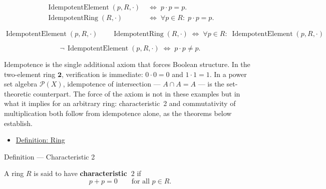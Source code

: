 \begin{remark*}
\[
\begin{aligned}
\operatorname{IdempotentElement}(p, R, \cdot)
&\;\Longleftrightarrow\; p \cdot p = p. \\[4pt]
\operatorname{IdempotentRing}(R, \cdot)
&\;\Longleftrightarrow\; \forall p \in R{:}\; p \cdot p = p.
\end{aligned}
\]
\end{remark*}

\begin{remark*}
\[
\operatorname{IdempotentElement}(p,R,\cdot)
\qquad
\operatorname{IdempotentRing}(R,\cdot)
\;\Longleftrightarrow\;
\forall p \in R{:}\;
\operatorname{IdempotentElement}(p,R,\cdot)
\]
\end{remark*}

\begin{remark*}
\[
\neg\,\operatorname{IdempotentElement}(p,R,\cdot)
\;\Longleftrightarrow\;
p \cdot p \neq p.
\]
\end{remark*}

\begin{remark*}[Interpretation]
Idempotence is the single additional axiom that forces Boolean
structure.  In the two-element ring $\mathbf{2}$, verification is
immediate: $0 \cdot 0 = 0$ and $1 \cdot 1 = 1$.  In a power set
algebra $\mathcal{P}(X)$, idempotence of intersection --- $A \cap A
= A$ --- is the set-theoretic counterpart.  The force of the axiom
is not in these examples but in what it implies for an arbitrary
ring: characteristic~2 and commutativity of multiplication both
follow from idempotence alone, as the theorems below establish.
\end{remark*}

\begin{remark*}[Dependencies]
\begin{itemize}
  \item \hyperref[def:ring]{Definition: Ring}
\end{itemize}
\end{remark*}


\begin{definitionbox}{Definition --- Characteristic 2}
\begin{definition}[Characteristic 2]
\label{def:characteristic-2}
A ring $R$ is said to have \textbf{characteristic~$2$} if
\[
p + p = 0 \qquad \text{for all } p \in R. \tag{10}
\]
\end{definition}
\end{definitionbox}

